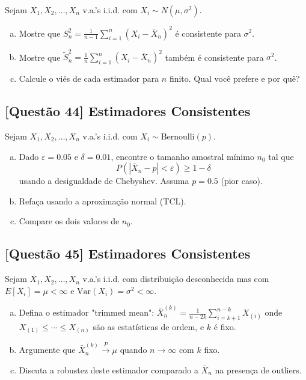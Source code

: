 \documentclass[12pt,a4paper]{article}
\begin{document}
Sejam $X_1, X_2, \ldots, X_n$ v.a.'s i.i.d. com $X_i \sim N(\mu, \sigma^2)$.

\begin{enumerate}[(a)]
    \item Mostre que $S_n^2 = \frac{1}{n-1}\sum_{i=1}^n(X_i - \bar{X}_n)^2$ é consistente para $\sigma^2$.
    \item Mostre que $\tilde{S}_n^2 = \frac{1}{n}\sum_{i=1}^n(X_i - \bar{X}_n)^2$ também é consistente para $\sigma^2$.
    \item Calcule o viés de cada estimador para $n$ finito. Qual você prefere e por quê?
\end{enumerate}

\subsection*{[Questão 44] Estimadores Consistentes}

Sejam $X_1, X_2, \ldots, X_n$ v.a.'s i.i.d. com $X_i \sim \text{Bernoulli}(p)$.

\begin{enumerate}[(a)]
    \item Dado $\varepsilon = 0.05$ e $\delta = 0.01$, encontre o tamanho amostral mínimo $n_0$ tal que
    \[
    P(|\bar{X}_n - p| < \varepsilon) \geq 1 - \delta
    \]
    usando a desigualdade de Chebyshev. Assuma $p = 0.5$ (pior caso).
    \item Refaça usando a aproximação normal (TCL).
    \item Compare os dois valores de $n_0$.
\end{enumerate}

\subsection*{[Questão 45] Estimadores Consistentes}

Sejam $X_1, X_2, \ldots, X_n$ v.a.'s i.i.d. com distribuição desconhecida mas com $E[X_i] = \mu < \infty$ e $\text{Var}(X_i) = \sigma^2 < \infty$.

\begin{enumerate}[(a)]
    \item Defina o estimador "trimmed mean": $\bar{X}_n^{(k)} = \frac{1}{n-2k}\sum_{i=k+1}^{n-k} X_{(i)}$ onde $X_{(1)} \leq \cdots \leq X_{(n)}$ são as estatísticas de ordem, e $k$ é fixo.
    \item Argumente que $\bar{X}_n^{(k)} \xrightarrow{P} \mu$ quando $n \to \infty$ com $k$ fixo.
    \item Discuta a robustez deste estimador comparado a $\bar{X}_n$ na presença de outliers.
\end{enumerate}
\end{document}
